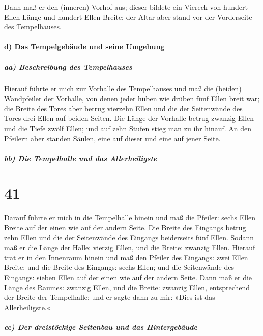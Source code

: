 Dann maß er den (inneren) Vorhof aus; dieser bildete ein
Viereck von hundert Ellen Länge und hundert Ellen Breite; der Altar aber
stand vor der Vorderseite des Tempelhauses.

\hypertarget{d-das-tempelgebuxe4ude-und-seine-umgebung}{%
\paragraph{d) Das Tempelgebäude und seine
Umgebung}\label{d-das-tempelgebuxe4ude-und-seine-umgebung}}

\hypertarget{aa-beschreibung-des-tempelhauses}{%
\subparagraph{aa) Beschreibung des
Tempelhauses}\label{aa-beschreibung-des-tempelhauses}}

Hierauf führte er mich zur Vorhalle des Tempelhauses und
maß die (beiden) Wandpfeiler der Vorhalle, von denen jeder hüben wie
drüben fünf Ellen breit war; die Breite des Tores aber betrug vierzehn
Ellen und die der Seitenwände des Tores drei Ellen auf beiden Seiten.
Die Länge der Vorhalle betrug zwanzig Ellen und die Tiefe
zwölf Ellen; und auf zehn Stufen stieg man zu ihr hinauf. An den
Pfeilern aber standen Säulen, eine auf dieser und eine auf jener Seite.

\hypertarget{bb-die-tempelhalle-und-das-allerheiligste}{%
\subparagraph{bb) Die Tempelhalle und das
Allerheiligste}\label{bb-die-tempelhalle-und-das-allerheiligste}}

\hypertarget{section-40}{%
\section{41}\label{section-40}}

Darauf führte er mich in die Tempelhalle hinein und maß
die Pfeiler: sechs Ellen Breite auf der einen wie auf der andern Seite.
Die Breite des Eingangs betrug zehn Ellen und die der
Seitenwände des Eingangs beiderseits fünf Ellen. Sodann maß er die Länge
der Halle: vierzig Ellen, und die Breite: zwanzig Ellen.
Hierauf trat er in den Innenraum hinein und maß den
Pfeiler des Eingangs: zwei Ellen Breite; und die Breite des Eingangs:
sechs Ellen; und die Seitenwände des Eingangs: sieben Ellen auf der
einen wie auf der andern Seite. Dann maß er die Länge des
Raumes: zwanzig Ellen, und die Breite: zwanzig Ellen, entsprechend der
Breite der Tempelhalle; und er sagte dann zu mir: »Dies ist das
Allerheiligste.«

\hypertarget{cc-der-dreistuxf6ckige-seitenbau-und-das-hintergebuxe4ude}{%
\subparagraph{cc) Der dreistöckige Seitenbau und das
Hintergebäude}\label{cc-der-dreistuxf6ckige-seitenbau-und-das-hintergebuxe4ude}}

